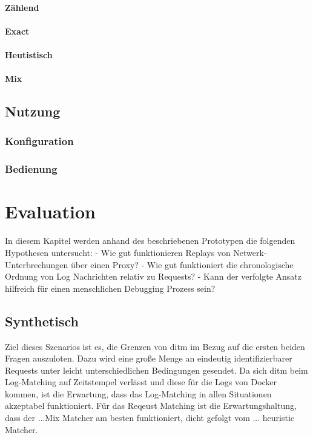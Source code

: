 \documentclass[a4paper]{report}
\begin{document}
\subsubsection{Zählend}
\subsubsection{Exact}
\subsubsection{Heutistisch}
\subsubsection{Mix}

\section{Nutzung}
\subsection{Konfiguration}
\subsection{Bedienung}

\chapter{Evaluation}
In diesem Kapitel werden anhand des beschriebenen Prototypen die folgenden Hypothesen untersucht:
- Wie gut funktionieren Replays von Netwerk-Unterbrechungen über einen Proxy?
- Wie gut funktioniert die chronologische Ordnung von Log Nachrichten relativ zu Requests?
- Kann der verfolgte Ansatz hilfreich für einen menschlichen Debugging Prozess sein?
\section{Synthetisch}
Ziel dieses Szenarios ist es, die Grenzen von ditm im Bezug auf die ersten beiden Fragen auszuloten.
Dazu wird eine große Menge an eindeutig identifizierbarer Requests unter leicht unterschiedlichen Bedingungen gesendet.
Da sich ditm beim Log-Matching auf Zeitstempel verlässt und diese für die Logs von Docker kommen, ist die Erwartung,
dass das Log-Matching in allen Situationen akzeptabel funktioniert. Für das Reqeust Matching ist die Erwartungshaltung, dass 
der ...Mix Matcher am besten funktioniert, dicht gefolgt vom ... heuristic Matcher.
\end{document}

